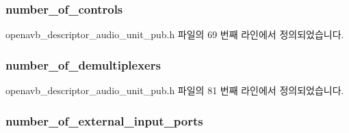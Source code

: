 \subsubsection[{\texorpdfstring{number\+\_\+of\+\_\+controls}{number_of_controls}}]{ number\+\_\+of\+\_\+controls}\hypertarget{structopenavb__aem__descriptor__audio__unit__t_ab8a96da60faf5e9dfdef4464fbfd5288}{}\label{structopenavb__aem__descriptor__audio__unit__t_ab8a96da60faf5e9dfdef4464fbfd5288}


openavb\+\_\+descriptor\+\_\+audio\+\_\+unit\+\_\+pub.\+h 파일의 69 번째 라인에서 정의되었습니다.

\subsubsection[{\texorpdfstring{number\+\_\+of\+\_\+demultiplexers}{number_of_demultiplexers}}]{ number\+\_\+of\+\_\+demultiplexers}\hypertarget{structopenavb__aem__descriptor__audio__unit__t_aa45379039726b666c03190124a509ce9}{}\label{structopenavb__aem__descriptor__audio__unit__t_aa45379039726b666c03190124a509ce9}


openavb\+\_\+descriptor\+\_\+audio\+\_\+unit\+\_\+pub.\+h 파일의 81 번째 라인에서 정의되었습니다.

\subsubsection[{\texorpdfstring{number\+\_\+of\+\_\+external\+\_\+input\+\_\+ports}{number_of_external_input_ports}}]{ number\+\_\+of\+\_\+external\+\_\+input\+\_\+ports}\hypertarget{structopenavb__aem__descriptor__audio__unit__t_a9fd5d7d8ddf4d554fd788aa20e00a1ed}{}\label{structopenavb__aem__descriptor__audio__unit__t_a9fd5d7d8ddf4d554fd788aa20e00a1ed}


